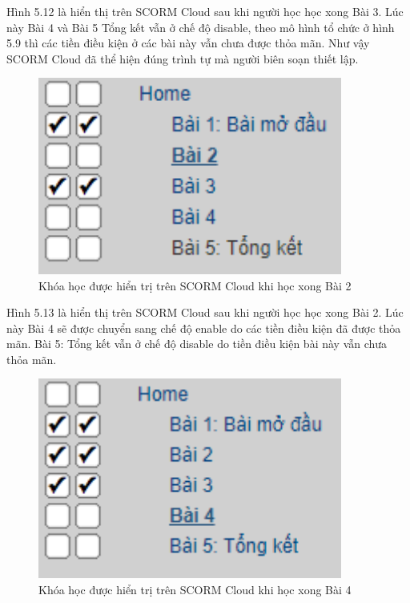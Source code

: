 Hình 5.12 là hiển thị trên SCORM Cloud sau khi người học học xong Bài 3. Lúc này Bài 4 và Bài 5 Tổng kết vẫn ở chế độ disable, theo mô hình tổ chức ở hình 5.9 thì các tiền điều kiện ở các bài này vẫn chưa được thỏa mãn. Như vậy SCORM Cloud đã thể hiện đúng trình tự mà người biên soạn thiết lập.

\newpage

\begin{center}
	\begin{figure}[htp]
		\begin{center}
			\includegraphics[width=10cm]{Chapter5/Pictures/picture513.png}
		\end{center}
		\caption{Khóa học được hiển trị trên SCORM Cloud khi học xong Bài 2}
		\label{refhinhchuong66}
	\end{figure}
\end{center}


Hình 5.13 là hiển thị trên SCORM Cloud sau khi người học học xong Bài 2. Lúc này Bài 4 sẽ được chuyển sang chế độ enable do các tiền điều kiện đã được thỏa mãn. Bài 5: Tổng kết vẫn ở chế độ disable do tiền điều kiện bài này vẫn chưa thỏa mãn.

\begin{center}
	\begin{figure}[htp]
		\begin{center}
			\includegraphics[width=10cm]{Chapter5/Pictures/picture514.png}
		\end{center}
		\caption{Khóa học được hiển trị trên SCORM Cloud khi học xong Bài 4}
		\label{refhinhchuong66}
	\end{figure}
\end{center}


